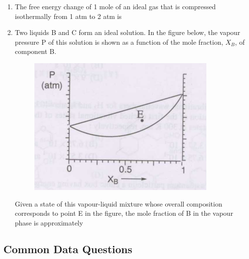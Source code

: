 \documentclass[journal,12pt,onecolumn]{IEEEtran}
\theoremstyle{remark}
\begin{document}
\begin{enumerate}[resume]
\item The free energy change  of 1 mole of an ideal gas that is compressed isothermally from 1 atm to 2 atm is
    \begin{enumerate}
    
        \hfill{}
    \end{enumerate}



\item Two liquids B and C form an ideal solution.
 In the figure below, the vapour pressure P of this solution is shown as a function of the mole fraction, $X_B$, of component B.
    \begin{figure}[H]
        \centering
        \includegraphics[width=0.4\columnwidth]{q50}
        \caption*{}
        \label{fig:q50}
    \end{figure}
    Given a state of this vapour-liquid mixture whose overall composition corresponds to point E in the figure, the mole fraction of B in the vapour phase is approximately
    \begin{enumerate}
  
        \hfill{}
    \end{enumerate}

\end{enumerate}

\subsection*{Common Data Questions}
\end{document}
